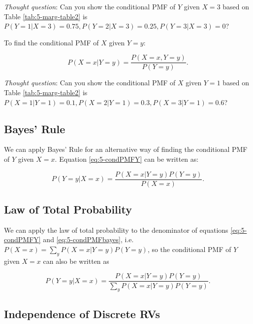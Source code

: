 \documentclass[
]{book}
\begin{document}
\emph{Thought question}: Can you show the conditional PMF of \(Y\) given \(X=3\) based on Table \ref{tab:5-marg-table2} is \(P(Y=1|X=3) = 0.75, P(Y=2|X=3) = 0.25, P(Y=3|X=3) = 0\)?

To find the conditional PMF of \(X\) given \(Y=y\):

\begin{equation} 
P(X=x|Y=y) = \frac{P(X=x, Y=y)}{P(Y=y)}.
\label{eq:5-condPMFX}
\end{equation}

\emph{Thought question}: Can you show the conditional PMF of \(X\) given \(Y=1\) based on Table \ref{tab:5-marg-table2} is \(P(X=1|Y=1) = 0.1, P(X=2|Y=1) = 0.3, P(X=3|Y=1) = 0.6\)?

\hypertarget{bayes-rule-1}{%
\subsection{Bayes' Rule}\label{bayes-rule-1}}

We can apply Bayes' Rule for an alternative way of finding the conditional PMF of \(Y\) given \(X=x\). Equation \eqref{eq:5-condPMFY} can be written as:

\begin{equation} 
P(Y=y|X=x) = \frac{P(X=x|Y=y) P(Y=y)}{P(X=x)}.
\label{eq:5-condPMFbayes}
\end{equation}

\hypertarget{law-of-total-probability-1}{%
\subsection{Law of Total Probability}\label{law-of-total-probability-1}}

We can apply the law of total probability to the denominator of equations \eqref{eq:5-condPMFY} and \eqref{eq:5-condPMFbayes}, i.e.~\(P(X=x) = \sum_y P(X=x|Y=y) P(Y=y)\), so the conditional PMF of \(Y\) given \(X=x\) can also be written as

\begin{equation} 
P(Y=y|X=x) = \frac{P(X=x|Y=y) P(Y=y)}{\sum_y P(X=x|Y=y) P(Y=y)}.
\label{eq:5-condPMFtotal}
\end{equation}

\hypertarget{independence-of-discrete-rvs}{%
\subsection{Independence of Discrete RVs}\label{independence-of-discrete-rvs}}
\end{document}
